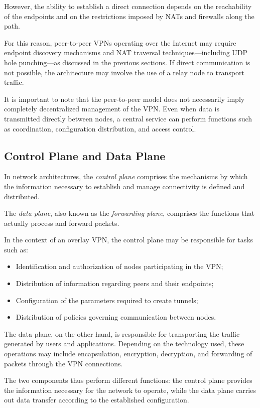 However, the ability to establish a direct connection depends on the reachability of the endpoints and on the restrictions imposed by NATs and firewalls along the path.

For this reason, peer-to-peer VPNs operating over the Internet may require endpoint discovery mechanisms and NAT traversal techniques—including UDP hole punching—as discussed in the previous sections. If direct communication is not possible, the architecture may involve the use of a relay node to transport traffic.

It is important to note that the peer-to-peer model does not necessarily imply completely decentralized management of the VPN. Even when data is transmitted directly between nodes, a central service can perform functions such as coordination, configuration distribution, and access control.

\subsection{Control Plane and Data Plane}
In network architectures, the \textit{control plane} comprises the mechanisms by which the information necessary to establish and manage connectivity is defined and distributed.

The \textit{data plane}, also known as the \textit{forwarding plane}, comprises the functions that actually process and forward packets.

In the context of an overlay VPN, the control plane may be responsible for tasks such as:
\begin{itemize}
	\item Identification and authorization of nodes participating in the VPN;
	\item Distribution of information regarding peers and their endpoints;
	\item Configuration of the parameters required to create tunnels;
	\item Distribution of policies governing communication between nodes.
\end{itemize}

The data plane, on the other hand, is responsible for transporting the traffic generated by users and applications. Depending on the technology used, these operations may include encapsulation, encryption, decryption, and forwarding of packets through the VPN connections.

The two components thus perform different functions: the control plane provides the information necessary for the network to operate, while the data plane carries out data transfer according to the established configuration.

